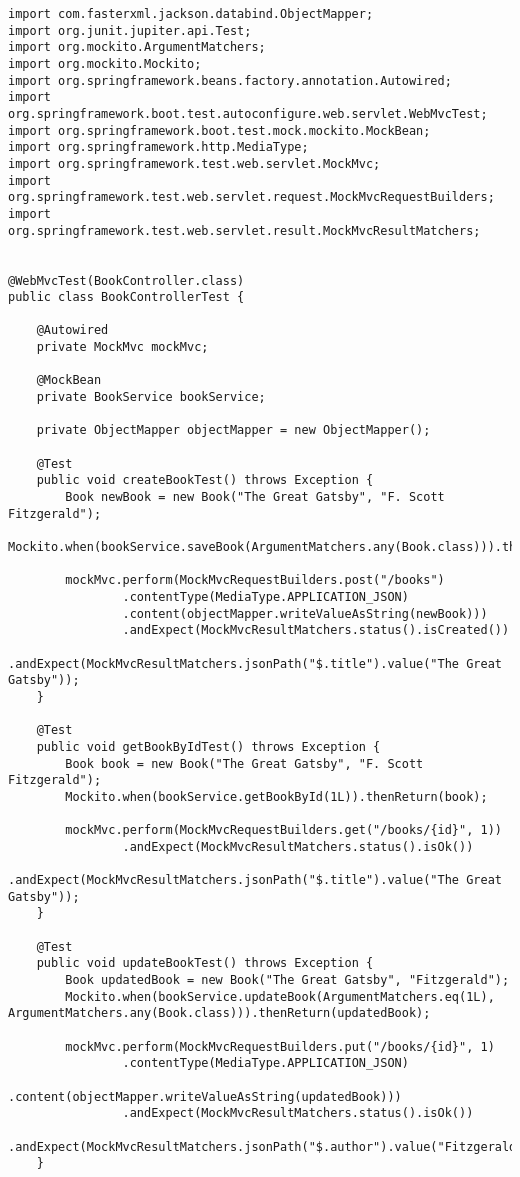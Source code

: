 \begin{lstlisting}
import com.fasterxml.jackson.databind.ObjectMapper;
import org.junit.jupiter.api.Test;
import org.mockito.ArgumentMatchers;
import org.mockito.Mockito;
import org.springframework.beans.factory.annotation.Autowired;
import org.springframework.boot.test.autoconfigure.web.servlet.WebMvcTest;
import org.springframework.boot.test.mock.mockito.MockBean;
import org.springframework.http.MediaType;
import org.springframework.test.web.servlet.MockMvc;
import org.springframework.test.web.servlet.request.MockMvcRequestBuilders;
import org.springframework.test.web.servlet.result.MockMvcResultMatchers;


@WebMvcTest(BookController.class)
public class BookControllerTest {

    @Autowired
    private MockMvc mockMvc;

    @MockBean
    private BookService bookService;

    private ObjectMapper objectMapper = new ObjectMapper();

    @Test
    public void createBookTest() throws Exception {
        Book newBook = new Book("The Great Gatsby", "F. Scott Fitzgerald");
        Mockito.when(bookService.saveBook(ArgumentMatchers.any(Book.class))).thenReturn(newBook);

        mockMvc.perform(MockMvcRequestBuilders.post("/books")
                .contentType(MediaType.APPLICATION_JSON)
                .content(objectMapper.writeValueAsString(newBook)))
                .andExpect(MockMvcResultMatchers.status().isCreated())
                .andExpect(MockMvcResultMatchers.jsonPath("$.title").value("The Great Gatsby"));
    }

    @Test
    public void getBookByIdTest() throws Exception {
        Book book = new Book("The Great Gatsby", "F. Scott Fitzgerald");
        Mockito.when(bookService.getBookById(1L)).thenReturn(book);

        mockMvc.perform(MockMvcRequestBuilders.get("/books/{id}", 1))
                .andExpect(MockMvcResultMatchers.status().isOk())
                .andExpect(MockMvcResultMatchers.jsonPath("$.title").value("The Great Gatsby"));
    }

    @Test
    public void updateBookTest() throws Exception {
        Book updatedBook = new Book("The Great Gatsby", "Fitzgerald");
        Mockito.when(bookService.updateBook(ArgumentMatchers.eq(1L), ArgumentMatchers.any(Book.class))).thenReturn(updatedBook);

        mockMvc.perform(MockMvcRequestBuilders.put("/books/{id}", 1)
                .contentType(MediaType.APPLICATION_JSON)
                .content(objectMapper.writeValueAsString(updatedBook)))
                .andExpect(MockMvcResultMatchers.status().isOk())
                .andExpect(MockMvcResultMatchers.jsonPath("$.author").value("Fitzgerald"));
    }


\end{lstlisting}
